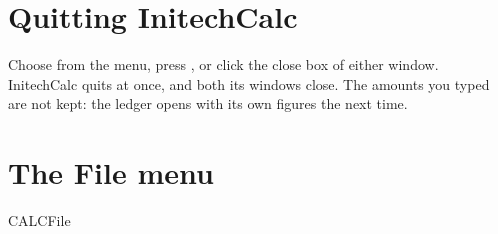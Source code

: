 \section{Quitting InitechCalc}
Choose  from the  menu, press ,
or click the close box of either window.  InitechCalc quits at once, and
both its windows close.  The amounts you typed are not kept: the ledger
opens with its own figures the next time.

\section{The File menu}
\begin{MenuReference}{CALC}{File}
\end{MenuReference}
